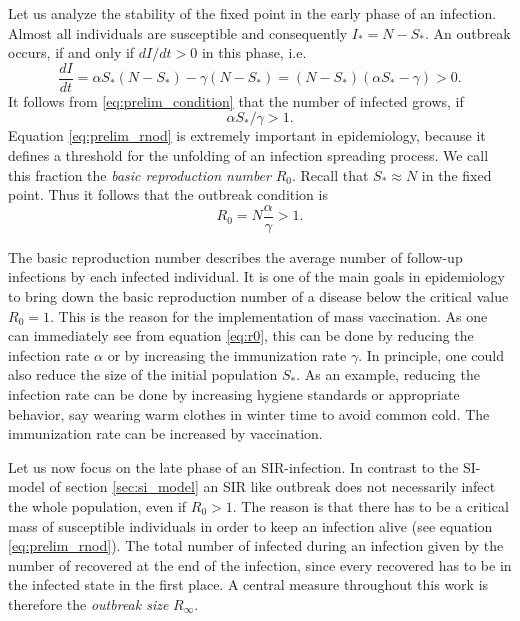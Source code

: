 Let us analyze the stability of the fixed point in the early phase of an infection.
Almost all individuals are susceptible and consequently $I_*=N-S_*$.
An outbreak occurs, if and only if $dI/dt >0$ in this phase, i.e.
\begin{equation}\label{eq:prelim_condition}
\frac{dI}{dt}=\alpha S_* (N-S_*) - \gamma (N-S_*)=(N-S_*)(\alpha S_* -\gamma ) >0.
\end{equation}
It follows from \eqref{eq:prelim_condition} that the number of infected grows, if
\begin{equation}\label{eq:prelim_rnod}
\alpha S_* / \gamma >1.
\end{equation}
Equation \eqref{eq:prelim_rnod} is extremely important in epidemiology, because it defines a threshold for the unfolding of an infection spreading process.
We call this fraction the \emph{basic reproduction number} $R_0$.
Recall that $S_* \approx N$ in the fixed point.
Thus it follows that the outbreak condition is
\begin{equation} \label{eq:r0}
R_0 = N \frac{\alpha }{\gamma } >1.
\end{equation}

The basic reproduction number describes the average number of follow-up infections by each infected individual.
It is one of the main goals in epidemiology to bring down the basic reproduction number of a disease below the critical value $R_0=1$.
This is the reason for the implementation of mass vaccination.
As one can immediately see from equation \eqref{eq:r0}, this can be done by reducing the infection rate $\alpha $ or by increasing the immunization rate $\gamma $.
In principle, one could also reduce the size of the initial population $S_*$.
As an example, reducing the infection rate can be done by increasing hygiene standards or appropriate behavior, say wearing warm clothes in winter time to avoid common cold.
The immunization rate can be increased by vaccination.

Let us now focus on the late phase of an SIR-infection.
In contrast to the SI-model of section \ref{sec:si_model} an SIR like outbreak does not necessarily infect the whole population, even if $R_0>1$.
The reason is that there has to be a critical mass of susceptible individuals in order to keep an infection alive (see equation \eqref{eq:prelim_rnod}).
The total number of infected during an infection given by the number of recovered at the end of the infection, since every recovered has to be in the infected state in the first place.
A central measure throughout this work is therefore the \emph{outbreak size} $R_\infty$.

